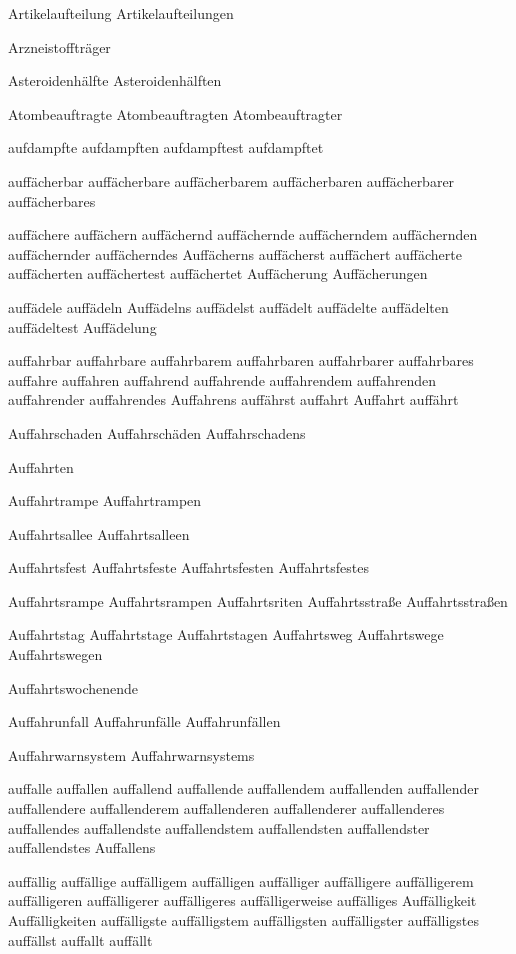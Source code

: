 Artikelaufteilung
Artikelaufteilungen

Arzneistoffträger

Asteroidenhälfte
Asteroidenhälften

Atombeauftragte
Atombeauftragten
Atombeauftragter

aufdampfte
aufdampften
aufdampftest
aufdampftet

auffächerbar
auffächerbare
auffächerbarem
auffächerbaren
auffächerbarer
auffächerbares

auffächere
auffächern
auffächernd
auffächernde
auffächerndem
auffächernden
auffächernder
auffächerndes
Auffächerns
auffächerst
auffächert
auffächerte
auffächerten
auffächertest
auffächertet
Auffächerung
Auffächerungen

auffädele
auffädeln
Auffädelns
auffädelst
auffädelt
auffädelte
auffädelten
auffädeltest
Auffädelung

auffahrbar
auffahrbare
auffahrbarem
auffahrbaren
auffahrbarer
auffahrbares
auffahre
auffahren
auffahrend
auffahrende
auffahrendem
auffahrenden
auffahrender
auffahrendes
Auffahrens
auffährst
auffahrt
Auffahrt
auffährt

Auffahrschaden
Auffahrschäden
Auffahrschadens

Auffahrten

Auffahrtrampe
Auffahrtrampen

Auffahrtsallee
Auffahrtsalleen

Auffahrtsfest
Auffahrtsfeste
Auffahrtsfesten
Auffahrtsfestes

Auffahrtsrampe
Auffahrtsrampen
Auffahrtsriten
Auffahrtsstraße
Auffahrtsstraßen

Auffahrtstag
Auffahrtstage
Auffahrtstagen
Auffahrtsweg
Auffahrtswege
Auffahrtswegen

Auffahrtswochenende

Auffahrunfall
Auffahrunfälle
Auffahrunfällen

Auffahrwarnsystem
Auffahrwarnsystems

auffalle
auffallen
auffallend
auffallende
auffallendem
auffallenden
auffallender
auffallendere
auffallenderem
auffallenderen
auffallenderer
auffallenderes
auffallendes
auffallendste
auffallendstem
auffallendsten
auffallendster
auffallendstes
Auffallens

auffällig
auffällige
auffälligem
auffälligen
auffälliger
auffälligere
auffälligerem
auffälligeren
auffälligerer
auffälligeres
auffälligerweise
auffälliges
Auffälligkeit
Auffälligkeiten
auffälligste
auffälligstem
auffälligsten
auffälligster
auffälligstes
auffällst
auffallt
auffällt

